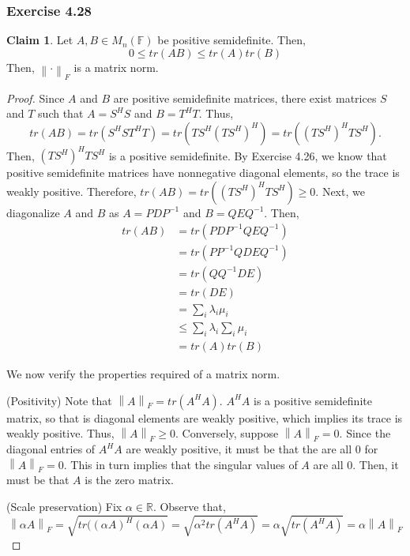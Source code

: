 \documentclass[letterpaper,12pt]{article}
\theoremstyle{definition}
\newtheorem{claim}[theorem]{Claim}
\newcommand{\norm}[1]{\left\lVert#1\right\rVert}
\begin{document}
\subsubsection*{Exercise 4.28}
\begin{claim}
	Let $A, B \in M_n (\mathbb{F})$ be positive semidefinite. Then,
	\begin{equation}
	0 \leq tr(AB) \leq tr(A)tr(B)
	\end{equation}
	Then, $\norm{\cdot}_F$ is a matrix norm.
\end{claim}
\begin{proof}
	Since $A$ and $B$ are positive semidefinite matrices, there exist matrices $S$ and $T$ such that $A = S^HS$ and $B = T^HT$. Thus,
	\begin{equation}
		tr(AB) = tr(S^HS  T^HT) = tr(T S^H (T S^H)^H) = tr((T S^H)^H T S^H).
	\end{equation}
	Then, $(T S^H)^H T S^H$ is a positive semidefinite. By Exercise 4.26, we know that positive semidefinite matrices have nonnegative diagonal elements, so the trace is weakly positive. Therefore, $ tr(AB) =  tr((T S^H)^H T S^H) \geq 0$. Next, we diagonalize $A$ and $B$ as $A = P D P^{-1}$ and $B = Q E Q^{-1}$. Then,
	\begin{align*}
	tr(AB) &= tr(P D P^{-1}   Q E Q^{-1}) \\
	&= tr(P P^{-1} Q D E Q^{-1}) \\
	&= tr(Q Q^{-1} DE) \\
	&= tr(DE) \\
	&= \sum_i \lambda_i \mu_i \tag{where $\lambda_i$ and $\mu_i$ are the eigenvalues of $A$ and $B$} \\
	&\leq \sum_i \lambda_i \sum_i \mu_i \\
	&= tr(A) tr(B)
	\end{align*}
	
	We now verify the properties required of a matrix norm.
	
	(Positivity) Note that $\norm{A}_F = tr(A^HA)$. $A^HA$ is a positive semidefinite matrix, so that is diagonal elements are weakly positive, which implies its trace is weakly positive. Thus,  $\norm{A}_F \geq 0$. Conversely, suppose $\norm{A}_F = 0$. Since the diagonal entries of $A^HA$ are weakly positive, it must be that the are all 0 for $\norm{A}_F = 0$. This in turn implies that the singular values of $A$ are all 0. Then, it must be that $A$ is the zero matrix.
	
	(Scale preservation) Fix $\alpha \in \mathbb{R}$. Observe that,
	\begin{equation}
	\norm{\alpha A}_F = \sqrt{tr((\alpha A)^H (\alpha A)} = \sqrt{\alpha^2tr( A^H A)} = \alpha \sqrt{tr(A^HA)} = \alpha \norm{A}_F 
	\end{equation}
	

\end{proof}
\end{document}
